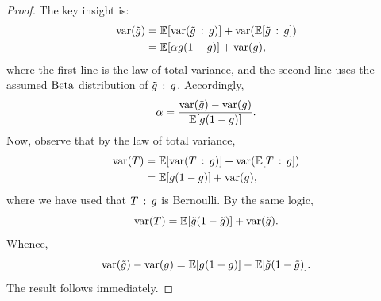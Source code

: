 \documentclass{article}
\begin{document}
\tgformula*
\begin{proof}
The key insight is:
\begin{align*}
\var(\tilde{g}) & =\EE[\var(\tilde{g}\given g)]+\var(\EE[\tilde{g}\given g])\\
 & =\EE[\alpha g(1-g)]+\var(g),
\end{align*}
where the first line is the law of total variance, and the second
line uses the assumed $\mathrm{Beta}$ distribution of $\tilde{g}\given g$.
Accordingly,
\[
\alpha=\frac{\mathrm{var}(\tilde{g})-\mathrm{var}(g)}{\mathbb{E}[g(1-g)]}.
\]
Now, observe that by the law of total variance,
\begin{align*}
  \var(T) &= \EE[\var(T \given g)] + \var(\EE[T \given g]) \\
          &= \EE[g(1-g)] + \var(g),
\end{align*}
where we have used that $T \given g$ is Bernoulli.
By the same logic,
\[
  \mathrm{var}(T) = \mathbb{E}[\tilde{g}(1-\tilde{g})] + \mathrm{var}(\tilde{g}).
\]
Whence,
\[
\mathrm{var}(\tilde{g}) - \mathrm{var}(g) = \mathbb{E}[g(1-g)] - \mathbb{E}[\tilde{g}(1-\tilde{g})].
\]
The result follows immediately.
\end{proof}


%
%
\end{document}
